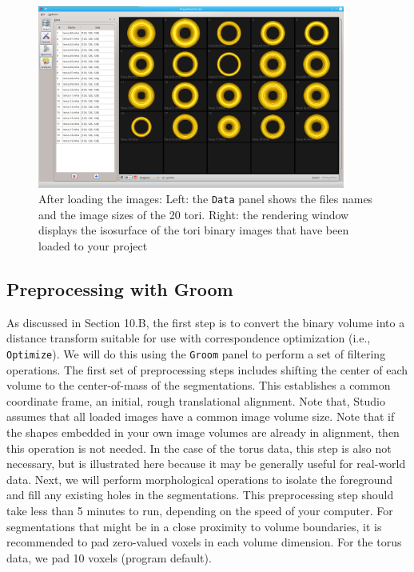 \documentclass[letterpaper,12pt]{article}   %
\begin{document}
\begin{figure}[!htp]
	\centering
	\includegraphics[width=0.9\textwidth]{figs_v2/torus_data.png}
	\caption{After loading the images: Left: the \texttt{Data} panel shows the files names and the image sizes of the 20 tori. Right: the rendering window displays the isosurface of the tori binary images that have been loaded to your project}
	\label{fig:torus_data}
\end{figure}

\subsection{Preprocessing with Groom}

As discussed in Section 10.B, the first step is to convert the binary volume into a distance transform suitable for use with correspondence optimization (i.e., \texttt{Optimize}). We will do this using the \texttt{Groom} panel to perform a set of filtering operations. The first set of preprocessing steps includes shifting the center of each volume to the center-of-mass of the segmentations. This establishes a common coordinate frame, an initial, rough translational alignment. Note that, Studio assumes that all loaded images have a common image volume size. Note that if the shapes embedded in your own image volumes are already in alignment, then this operation is not needed. In the case of the torus data, this step is also not necessary, but is illustrated here because it may be generally useful for real-world data. Next, we will perform morphological operations to isolate the foreground and fill any existing holes in the segmentations. This preprocessing step should take less than 5 minutes to run, depending on the speed of your computer. For segmentations that might be in a close proximity to volume boundaries, it is recommended to pad zero-valued voxels in each volume dimension. For the torus data, we pad 10 voxels (program default). 
\end{document}
